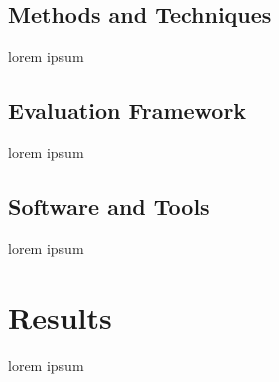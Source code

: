 \documentclass{report}
\begin{document}
	\newpage
	\section{Methods and Techniques}
	
	lorem ipsum
	
	\section{Evaluation Framework}
	
	lorem ipsum
	
	\section{Software and Tools}
	
	lorem ipsum
	
	\chapter{Results}
	
	lorem ipsum
	
	
\end{document}
